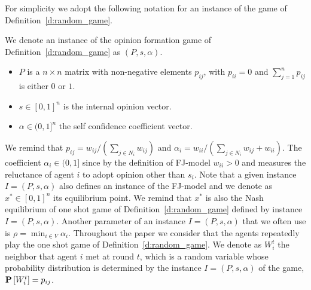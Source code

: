 For simplicity we adopt the following notation for
an instance of the game of Definition~\ref{d:random_game}.
%
\begin{definition}\label{d:instance}
  We denote an instance of the opinion formation game of Definition~\ref{d:random_game}
  as $(P,s,\alpha)$.
  \begin{itemize}
    \item $P$ is a $n \times n$  matrix with non-negative elements $p_{ij}$,
      with $p_{ii}=0$ and $\sum_{j=1}^n p_{ij}$ is either $0$ or $1$.
    \item $s \in [0,1]^n$ is the internal opinion vector.
    \item $\alpha \in (0,1]^n$ the self confidence coefficient vector.
  \end{itemize}
\end{definition}
%
We remind that $p_{ij} = w_{ij}/(\sum_{j \in N_i}w_{ij})$ and 
$\alpha_i=w_{ii}/(\sum_{j \in N_i}w_{ij}+w_{ii})$. The coefficient
$\alpha_i \in (0,1]$ since by the definition of FJ-model $w_{ii}>0$
and measures the reluctance of agent $i$ to adopt opinion other
than $s_i$. Note that a given instance $I=(P,s,\alpha)$ also 
defines an instance of the FJ-model and we denote as $x^* \in [0,1]^n$
its equilibrium point. We remind that $x^*$ is also the Nash equilibrium
of one shot game of Definition~\ref{d:random_game} defined by instance $I=(P,s,\alpha)$.
Another parameter of an instance $I=(P,s,\alpha)$ that we often use is
$\rho=\min_{i \in V}\alpha_i$. Throughout the paper we consider that 
the agents repeatedly play the one shot game of Definition~\ref{d:random_game}.
We denote as $W_i^t$ the neighbor that agent $i$ met
at round $t$, which is a random variable whose 
probability distribution is determined by the 
instance $I=(P,s,\alpha)$ of the game, $\bm{\mathrm{P}}\left[W_i^t\right]=p_{ij}$.






